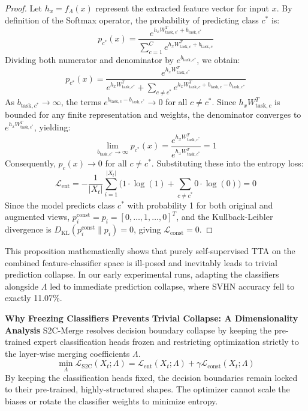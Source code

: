 \documentclass{article}
\theoremstyle{plain}
\theoremstyle{definition}
\theoremstyle{remark}
\begin{document}
\begin{proof}
Let $h_x = f_{\Lambda}(x)$ represent the extracted feature vector for input $x$. By definition of the Softmax operator, the probability of predicting class $c^*$ is:
\begin{equation}
    p_{c^*}(x) = \frac{e^{h_x W_{\text{task}, c^*}^T + b_{\text{task}, c^*}}}{\sum_{c=1}^C e^{h_x W_{\text{task}, c}^T + b_{\text{task}, c}}}
\end{equation}
Dividing both numerator and denominator by $e^{b_{\text{task}, c^*}}$, we obtain:
\begin{equation}
    p_{c^*}(x) = \frac{e^{h_x W_{\text{task}, c^*}^T}}{e^{h_x W_{\text{task}, c^*}^T} + \sum_{c \neq c^*} e^{h_x W_{\text{task}, c}^T + b_{\text{task}, c} - b_{\text{task}, c^*}} }
\end{equation}
As $b_{\text{task}, c^*} \to \infty$, the terms $e^{b_{\text{task}, c} - b_{\text{task}, c^*}} \to 0$ for all $c \neq c^*$. Since $h_x W_{\text{task}, c}^T$ is bounded for any finite representation and weights, the denominator converges to $e^{h_x W_{\text{task}, c^*}^T}$, yielding:
\begin{equation}
    \lim_{b_{\text{task}, c^*} \to \infty} p_{c^*}(x) = \frac{e^{h_x W_{\text{task}, c^*}^T}}{e^{h_x W_{\text{task}, c^*}^T}} = 1
\end{equation}
Consequently, $p_c(x) \to 0$ for all $c \neq c^*$. Substituting these into the entropy loss:
\begin{equation}
    \mathcal{L}_{\text{ent}} = - \frac{1}{|X_t|} \sum_{i=1}^{|X_t|} \Big( 1 \cdot \log(1) + \sum_{c \neq c^*} 0 \cdot \log(0) \Big) = 0
\end{equation}
Since the model predicts class $c^*$ with probability 1 for both original and augmented views, $p^{\text{const}}_i = p_i = [0, \dots, 1, \dots, 0]^T$, and the Kullback-Leibler divergence is $D_{\text{KL}}(p^{\text{const}}_i \parallel p_i) = 0$, giving $\mathcal{L}_{\text{const}} = 0$.
\end{proof}

This proposition mathematically shows that purely self-supervised TTA on the combined feature-classifier space is ill-posed and inevitably leads to trivial prediction collapse. In our early experimental runs, adapting the classifiers alongside $\Lambda$ led to immediate prediction collapse, where SVHN accuracy fell to exactly 11.07\%.

\textbf{Why Freezing Classifiers Prevents Trivial Collapse: A Dimensionality Analysis}
S2C-Merge resolves decision boundary collapse by keeping the pre-trained expert classification heads frozen and restricting optimization strictly to the layer-wise merging coefficients $\Lambda$.
\begin{equation}
    \min_{\Lambda} \mathcal{L}_{\text{S2C}}(X_t; \Lambda) = \mathcal{L}_{\text{ent}}(X_t; \Lambda) + \gamma \mathcal{L}_{\text{const}}(X_t; \Lambda)
\end{equation}
By keeping the classification heads fixed, the decision boundaries remain locked to their pre-trained, highly-structured shapes. The optimizer cannot scale the biases or rotate the classifier weights to minimize entropy. 
\end{document}
